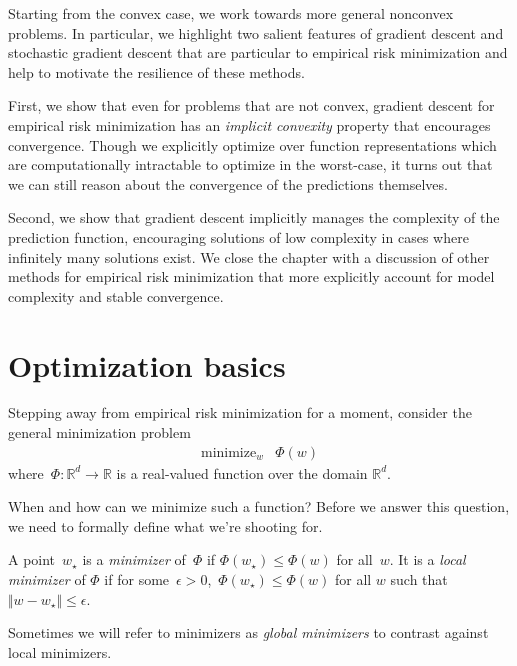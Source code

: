 \documentclass{tufte-book}
\begin{document}
Starting from the convex case, we work towards more general nonconvex
problems. In particular, we highlight two salient features of gradient
descent and stochastic gradient descent that are particular to empirical
risk minimization and help to motivate the resilience of these methods.

First, we show that even for problems that are not convex, gradient
descent for empirical risk minimization has an \emph{implicit convexity}
property that encourages convergence. Though we explicitly optimize over
function representations which are computationally intractable to
optimize in the worst-case, it turns out that we can still reason about
the convergence of the predictions themselves.

Second, we show that gradient descent implicitly manages the complexity
of the prediction function, encouraging solutions of low complexity in
cases where infinitely many solutions exist. We close the chapter with a
discussion of other methods for empirical risk minimization that more
explicitly account for model complexity and stable convergence.

\hypertarget{optimization-basics}{%
\section{Optimization basics}\label{optimization-basics}}

Stepping away from empirical risk minimization for a moment, consider
the general minimization problem \[
\begin{array}{ll}
    \text{minimize}_w  & \Phi(w)
\end{array}
\] where~\(\Phi\colon\mathbb{R}^d\to\mathbb{R}\) is a real-valued
function over the domain \(\mathbb{R}^d\).

When and how can we minimize such a function? Before we answer this
question, we need to formally define what we're shooting for.

\begin{Definition}

A point~\(w_\star\) is a \emph{minimizer} of~\(\Phi\) if
\(\Phi(w_\star)\leq \Phi(w)\) for all~\(w\). It is a \emph{local
minimizer} of \(\Phi\) if for
some~\(\epsilon> 0\),~\(\Phi(w_\star)\leq \Phi(w)\) for all \(w\) such
that~\(\Vert w-w_\star \Vert\leq \epsilon\).

Sometimes we will refer to minimizers as \emph{global minimizers} to
contrast against local minimizers.

\end{Definition}
\end{document}
